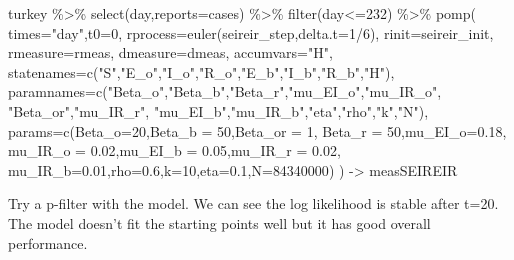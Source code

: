 \documentclass[
]{article}
\newenvironment{Shaded}{\begin{snugshade}}{\end{snugshade}}
\newcommand{\AttributeTok}[1]{\textcolor[rgb]{0.77,0.63,0.00}{#1}}
\newcommand{\DecValTok}[1]{\textcolor[rgb]{0.00,0.00,0.81}{#1}}
\newcommand{\FloatTok}[1]{\textcolor[rgb]{0.00,0.00,0.81}{#1}}
\newcommand{\FunctionTok}[1]{\textcolor[rgb]{0.00,0.00,0.00}{#1}}
\newcommand{\NormalTok}[1]{#1}
\newcommand{\OtherTok}[1]{\textcolor[rgb]{0.56,0.35,0.01}{#1}}
\newcommand{\SpecialCharTok}[1]{\textcolor[rgb]{0.00,0.00,0.00}{#1}}
\newcommand{\StringTok}[1]{\textcolor[rgb]{0.31,0.60,0.02}{#1}}
\begin{document}
\begin{Shaded}
\begin{Highlighting}[]
\NormalTok{turkey }\SpecialCharTok{\%\textgreater{}\%}
  \FunctionTok{select}\NormalTok{(day,}\AttributeTok{reports=}\NormalTok{cases) }\SpecialCharTok{\%\textgreater{}\%}
  \FunctionTok{filter}\NormalTok{(day}\SpecialCharTok{\textless{}=}\DecValTok{232}\NormalTok{) }\SpecialCharTok{\%\textgreater{}\%}
  \FunctionTok{pomp}\NormalTok{(}
    \AttributeTok{times=}\StringTok{"day"}\NormalTok{,}\AttributeTok{t0=}\DecValTok{0}\NormalTok{,}
    \AttributeTok{rprocess=}\FunctionTok{euler}\NormalTok{(seireir\_step,}\AttributeTok{delta.t=}\DecValTok{1}\SpecialCharTok{/}\DecValTok{6}\NormalTok{),}
    \AttributeTok{rinit=}\NormalTok{seireir\_init,}
    \AttributeTok{rmeasure=}\NormalTok{rmeas,}
    \AttributeTok{dmeasure=}\NormalTok{dmeas,}
    \AttributeTok{accumvars=}\StringTok{"H"}\NormalTok{,}
    \AttributeTok{statenames=}\FunctionTok{c}\NormalTok{(}\StringTok{"S"}\NormalTok{,}\StringTok{"E\_o"}\NormalTok{,}\StringTok{"I\_o"}\NormalTok{,}\StringTok{"R\_o"}\NormalTok{,}\StringTok{"E\_b"}\NormalTok{,}\StringTok{"I\_b"}\NormalTok{,}\StringTok{"R\_b"}\NormalTok{,}\StringTok{"H"}\NormalTok{),}
    \AttributeTok{paramnames=}\FunctionTok{c}\NormalTok{(}\StringTok{"Beta\_o"}\NormalTok{,}\StringTok{"Beta\_b"}\NormalTok{,}\StringTok{"Beta\_r"}\NormalTok{,}\StringTok{"mu\_EI\_o"}\NormalTok{,}\StringTok{"mu\_IR\_o"}\NormalTok{,}
                 \StringTok{"Beta\_or"}\NormalTok{,}\StringTok{"mu\_IR\_r"}\NormalTok{,}
                 \StringTok{"mu\_EI\_b"}\NormalTok{,}\StringTok{"mu\_IR\_b"}\NormalTok{,}\StringTok{"eta"}\NormalTok{,}\StringTok{"rho"}\NormalTok{,}\StringTok{"k"}\NormalTok{,}\StringTok{"N"}\NormalTok{),}
    \AttributeTok{params=}\FunctionTok{c}\NormalTok{(}\AttributeTok{Beta\_o=}\DecValTok{20}\NormalTok{,}\AttributeTok{Beta\_b =} \DecValTok{50}\NormalTok{,}\AttributeTok{Beta\_or =} \DecValTok{1}\NormalTok{, }\AttributeTok{Beta\_r =} \DecValTok{50}\NormalTok{,}\AttributeTok{mu\_EI\_o=}\FloatTok{0.18}\NormalTok{,}
             \AttributeTok{mu\_IR\_o =} \FloatTok{0.02}\NormalTok{,}\AttributeTok{mu\_EI\_b =} \FloatTok{0.05}\NormalTok{,}\AttributeTok{mu\_IR\_r =} \FloatTok{0.02}\NormalTok{, }
             \AttributeTok{mu\_IR\_b=}\FloatTok{0.01}\NormalTok{,}\AttributeTok{rho=}\FloatTok{0.6}\NormalTok{,}\AttributeTok{k=}\DecValTok{10}\NormalTok{,}\AttributeTok{eta=}\FloatTok{0.1}\NormalTok{,}\AttributeTok{N=}\DecValTok{84340000}\NormalTok{)}
\NormalTok{  ) }\OtherTok{{-}\textgreater{}}\NormalTok{ measSEIREIR}
\end{Highlighting}
\end{Shaded}

Try a p-filter with the model. We can see the log likelihood is stable
after t=20. The model doesn't fit the starting points well but it has
good overall performance.
\end{document}
